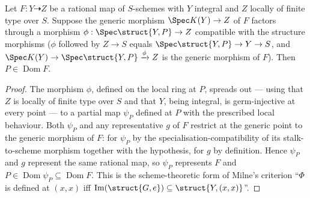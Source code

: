 \begin{theorem}
  \label{thm:spreading_criterion_stalk}
  \leanok
  Let \(F : Y \dashrightarrow Z\) be a rational map of \(S\)-schemes with \(Y\)
  integral and \(Z\) locally of finite type over \(S\). Suppose the generic
  morphism \(\Spec K(Y) \to Z\) of \(F\) factors through a morphism
  \(\phi : \Spec \struct{Y,P} \to Z\) compatible with the structure morphisms
  (\(\phi\) followed by \(Z \to S\) equals \(\Spec \struct{Y,P} \to Y \to S\),
  and \(\Spec K(Y) \to \Spec \struct{Y,P} \xrightarrow{\phi} Z\) is the generic
  morphism of \(F\)). Then \(P \in \operatorname{Dom} F\).
\end{theorem}
\begin{proof}
  \leanok
  The morphism \(\phi\), defined on the local ring at \(P\), spreads out --- using
  that \(Z\) is locally of finite type over \(S\) and that \(Y\), being integral,
  is germ-injective at every point --- to a partial map \(\psi_P\) defined at
  \(P\) with the prescribed local behaviour. Both \(\psi_P\) and any
  representative \(g\) of \(F\) restrict at the generic point to the generic
  morphism of \(F\): for \(\psi_P\) by the specialisation-compatibility of its
  stalk-to-scheme morphism together with the hypothesis, for \(g\) by definition.
  Hence \(\psi_P\) and \(g\) represent the same rational map, so \(\psi_P\)
  represents \(F\) and \(P \in \operatorname{Dom}\psi_P \subseteq
  \operatorname{Dom} F\). This is the scheme-theoretic form of Milne's criterion
  ``\(\Phi\) is defined at \((x, x)\) iff \(\operatorname{Im}(\struct{G,e})
  \subseteq \struct{Y,(x,x)}\)''.
\end{proof}

